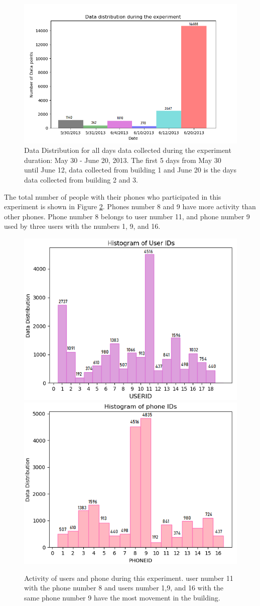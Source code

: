 \begin{figure}
    \centering
    \includegraphics[width = 12 cm]{image/Chapters/Chapter6/timedist.png}
    \caption{Data Distribution for all days data collected during the experiment duration: May 30 - June 20, 2013. The first 5  days from May 30 until June 12, data collected from building 1 and June 20 is the days data collected from building 2 and 3.}
    \label{timeline}
\end{figure}





The total number of people with their phones who participated in this experiment is shown in Figure \ref{userphone}. Phones number 8 and 9 have more activity than other phones. Phone number 8 belongs to user number 11, and phone number 9 used by three users with the numbers 1, 9, and 16.

\begin{figure}[!h]
    \centering
    \includegraphics[width=.5\textwidth]{image/Chapters/Chapter6/userID_data.png}\hfill
    \includegraphics[width=.5\textwidth]{image/Chapters/Chapter6/phoneID_data.png}
    \\[\smallskipamount]    
    \caption{Activity of users and phone during this experiment. user number 11 with the phone number 8 and users number 1,9, and 16 with the same phone number 9 have the most movement in the building.}
    \label{userphone}
\end{figure}


